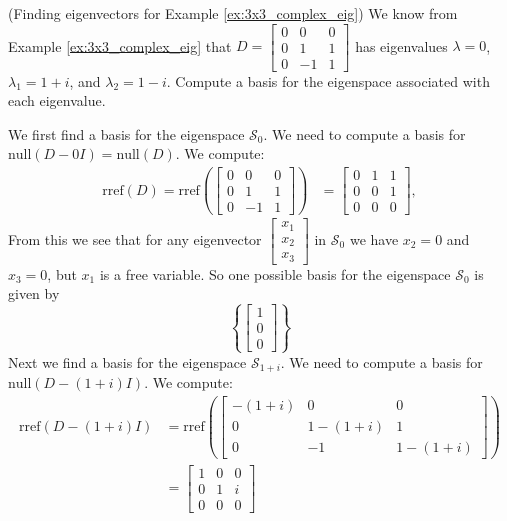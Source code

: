 \documentclass{ximera}
\begin{document}
\begin{example}\label{ex:3x3_complex_ev} (Finding eigenvectors for Example \ref{ex:3x3_complex_eig})
We know from Example \ref{ex:3x3_complex_eig} that $D=\begin{bmatrix} 0&0&0\\ 0 &1&1\\ 0 & -1&1\end{bmatrix}$ has eigenvalues $\lambda=0$, $\lambda_1=1+i$, and $\lambda_2=1-i$.  Compute a basis for the eigenspace associated with each eigenvalue.
\begin{explanation}
We first find a basis for the eigenspace $\mathcal{S}_0$.  We need to compute a basis for $\mbox{null}(D-0I)=\mbox{null}(D)$.  We compute:
\begin{align*}\mbox{rref}(D)=\mbox{rref}\left(\begin{bmatrix} 0&0&0\\ 0 &1&1\\ 0 & -1&1\end{bmatrix}\right)&=\begin{bmatrix} 0 & 1 & 1\\ 0 & 0 & 1\\ 0 & 0 & 0\end{bmatrix},
\end{align*}
From this we see that for any eigenvector $\begin{bmatrix}x_1\\x_2\\x_3\end{bmatrix}$ in $\mathcal{S}_0$ we have $x_2=0$ and $x_3=0$, but $x_1$ is a free variable. 
So one possible basis for the eigenspace $\mathcal{S}_0$ is given by $$\left\{\begin{bmatrix}1\\0\\0\end{bmatrix}\right\}$$
Next we find a basis for the eigenspace $\mathcal{S}_{1+i}$.  We need to compute a basis for $\mbox{null}(D-(1+i)I)$.  We compute:
\begin{align*}\mbox{rref}(D-(1+i)I)&=\mbox{rref}\left(\begin{bmatrix} -(1+i)&0&0\\ 0 &1-(1+i)&1\\ 0 & -1&1-(1+i)\end{bmatrix}\right) \\
&=\begin{bmatrix} 1 & 0 &0\\ 0 & 1 & i\\ 0 & 0 & 0\end{bmatrix}

\end{align*}
\end{explanation}
\end{example}
\end{document}
